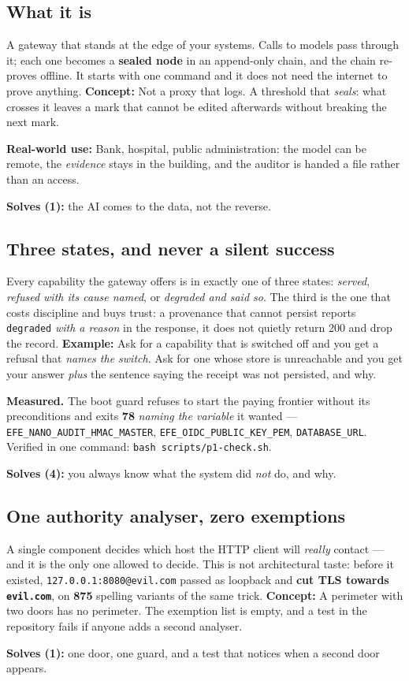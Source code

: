 \documentclass[11pt]{article}
\newcommand{\mesure}[1]{{\color{efeteal}\textbf{Measured.} }#1\par}
\newcommand{\concept}[1]{{\color{efenavy}\textbf{Concept:} }#1\par}
\newcommand{\exemple}[1]{{\color{efeamber}\textbf{Example:} }#1\par}
\newcommand{\utilite}[1]{{\color{efeplum}\textbf{Real-world use:} }#1\par}
\newcommand{\solves}[2]{{\color{efesolve}\textbf{Solves #1:} }#2\par}
\begin{document}
\subsection{What it is}
A gateway that stands at the edge of your systems. Calls to models pass through it; each one becomes
a \textbf{sealed node} in an append-only chain, and the chain re-proves offline. It starts with one
command and it does not need the internet to prove anything.
\concept{Not a proxy that logs. A threshold that \emph{seals}: what crosses it leaves a mark that
cannot be edited afterwards without breaking the next mark.}
\utilite{Bank, hospital, public administration: the model can be remote, the \emph{evidence} stays
in the building, and the auditor is handed a file rather than an access.}
\solves{(1)}{the AI comes to the data, not the reverse.}

\subsection{Three states, and never a silent success}
Every capability the gateway offers is in exactly one of three states: \emph{served}, \emph{refused
with its cause named}, or \emph{degraded and said so}. The third is the one that costs discipline and
buys trust: a provenance that cannot persist reports \texttt{degraded} \emph{with a reason} in the
response, it does not quietly return 200 and drop the record.
\exemple{Ask for a capability that is switched off and you get a refusal that \emph{names the
switch}. Ask for one whose store is unreachable and you get your answer \emph{plus} the sentence
saying the receipt was not persisted, and why.}
\mesure{The boot guard refuses to start the paying frontier without its preconditions and exits
\textbf{78} \emph{naming the variable} it wanted --- \texttt{EFE\_NANO\_AUDIT\_HMAC\_MASTER},
\texttt{EFE\_OIDC\_PUBLIC\_KEY\_PEM}, \texttt{DATABASE\_URL}. Verified in one command:
\texttt{bash scripts/p1-check.sh}.}
\solves{(4)}{you always know what the system did \emph{not} do, and why.}

\subsection{One authority analyser, zero exemptions}
A single component decides which host the HTTP client will \emph{really} contact --- and it is the
only one allowed to decide. This is not architectural taste: before it existed,
\texttt{127.0.0.1:8080@evil.com} passed as loopback and \textbf{cut TLS towards
\texttt{evil.com}}, on \textbf{875} spelling variants of the same trick.
\concept{A perimeter with two doors has no perimeter. The exemption list is empty, and a test in the
repository fails if anyone adds a second analyser.}
\solves{(1)}{one door, one guard, and a test that notices when a second door appears.}
\end{document}
